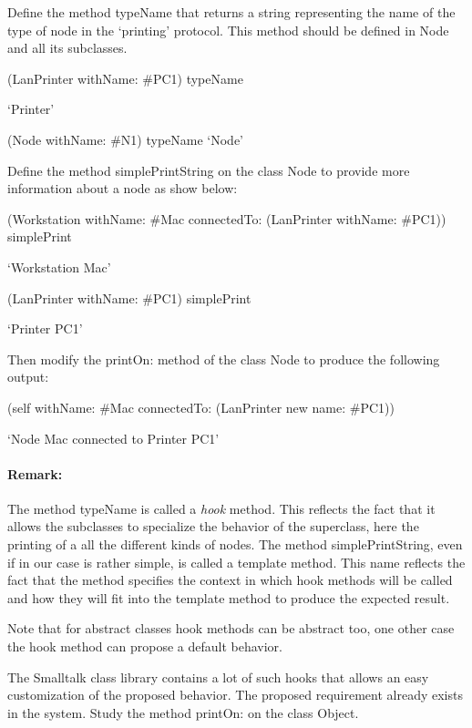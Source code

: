 Define the method typeName that returns a string representing 
the name of the type of node in the `printing' protocol. This 
method should be defined in Node and all its subclasses. 

\begin{code}
(LanPrinter withName: \#PC1) typeName

      `Printer'

(Node withName: \#N1) typeName
     `Node'
\end{code}

 
Define the method simplePrintString on the class Node to provide 
more information about a node as show below:

\begin{code}
(Workstation withName: \#Mac connectedTo: (LanPrinter withName: 
\#PC1)) simplePrint

`Workstation Mac'

(LanPrinter withName: \#PC1) simplePrint

`Printer PC1'
\end{code}

Then modify the printOn: method of the class Node to produce 
the following output:
\begin{code}
(self withName: \#Mac connectedTo: (LanPrinter new name: 
\#PC1))

`Node Mac connected to Printer PC1'
\end{code}

\paragraph{Remark:} The method typeName is called a \textit{hook} method. This 
reflects the fact that it allows the subclasses to specialize 
the behavior of the superclass, here the printing of a all the 
different kinds of nodes. The method simplePrintString, even 
if in our case is rather simple, is called a template method. 
This name reflects the fact that the method specifies the context 
in which hook methods will be called and how they will fit into 
the template method to produce the expected result. 


Note that for abstract classes hook methods can be abstract too, 
one other case the hook method can propose a default behavior.

The Smalltalk class library contains a lot of such hooks that 
allows an easy customization of the proposed behavior. The proposed 
requirement already exists in the system. Study the method printOn: 
on the class Object. 

\endinput